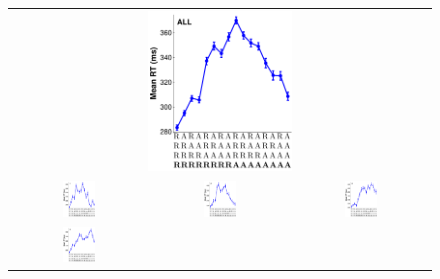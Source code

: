 \documentclass{apa}[12pt]
\begin{document}
\begin{figure}
\centering
\begin{tabular}{ccc}
\multicolumn{3}{c}{\includegraphics[width=0.35\textwidth]{cho_rsi_500ms.pdf}} \\

\includegraphics[width=0.25\textwidth]{subject1_500ms.pdf}\label{individual1}
   & \includegraphics[width=0.25\textwidth]{subject2_500ms.pdf}\label{individual2}
   & \includegraphics[width=0.25\textwidth]{subject3_500ms.pdf}\label{individual3}\\
\includegraphics[width=0.25\textwidth]{subject4_500ms.pdf}\label{individual4}

\end{tabular}
\end{figure}
\end{document}
